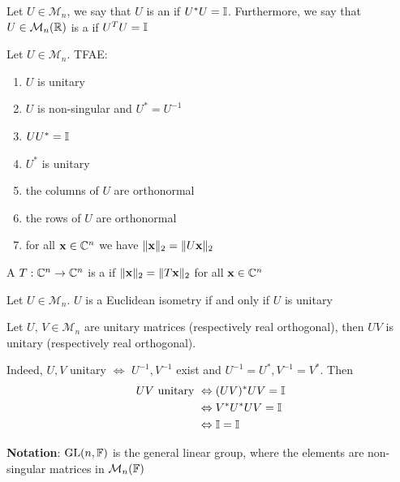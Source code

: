 \documentclass[aspectratio=169]{beamer}
\begin{document}
\begin{frame}
\begin{definition}
Let $U\in \mathcal{M}_n$, we say that $U$ is an  if $U^*U=\mathbb{I}$. Furthermore, we say that $U\in \mathcal{M}_n(\mathbb{R})$ is a  if $U^TU=\mathbb{I}$
\end{definition}
\vfill
\begin{theorem}
 Let $U\in \mathcal{M}_n$. TFAE:
 \begin{enumerate}
     \item $U$ is unitary
     \item $U$ is non-singular and $U^*=U^{-1}$
     \item $UU^*=\mathbb{I}$
     \item $U^*$ is unitary
     \item the columns of $U$ are orthonormal
     \item the rows of $U$ are orthonormal
     \item for all $\mathbf{x}\in \mathbb{C}^n$ we have $\|\mathbf{x}\|_2= \|U\mathbf{x}\|_2$
 \end{enumerate}
\end{theorem}
\end{frame}

\begin{frame}
\begin{definition}
A  $T: \mathbb{C}^n \to \mathbb{C}^n$ is a  if $\|\mathbf{x}\|_2= \| T\mathbf{x} \|_2$ for all $\mathbf{x}\in \mathbb{C}^n$ 
\end{definition}
\vfill
\begin{corollary}
Let $U \in \mathcal{M}_n$. $U$ is a Euclidean isometry if and only if $U$ is unitary
\end{corollary}
\end{frame}



\begin{frame}
\begin{remark}
Let $U,\, V\in \mathcal{M}_n$ are unitary matrices (respectively real orthogonal), then $UV$ is unitary (respectively real orthogonal).

Indeed, $U,V$ unitary $\Leftrightarrow$ $U^{-1},V^{-1}$ exist and $U^{-1}=U^*,V^{-1}=V^*$. Then
\begin{align*}
UV\textrm{ unitary } &\Leftrightarrow (UV)^*UV=\mathbb{I} \\
&\Leftrightarrow V^*U^*UV=\mathbb{I} \\
&\Leftrightarrow \mathbb{I} = \mathbb{I}
\end{align*}
\end{remark}
\vfill
\textbf{Notation}: $\operatorname{GL}(n, \mathbb{F})$ is the general linear group, where the elements are non-singular matrices in $\mathcal{M}_n(\mathbb{F})$
\end{frame}
\end{document}
